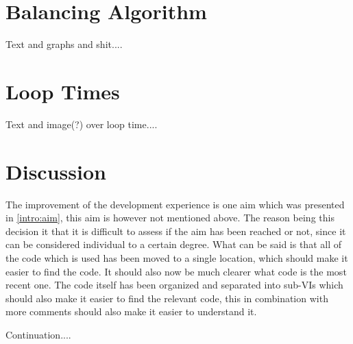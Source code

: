 \section{Balancing Algorithm} \label{results:balancing}

Text and graphs and shit....

\section{Loop Times}

Text and image(?) over loop time....

\section{Discussion}

The improvement of the development experience is one aim which was presented in \ref{intro:aim}, this aim is however not mentioned above. The reason being this decision it that it is difficult to assess if the aim has been reached or not, since it can be considered individual to a certain degree. What can be said is that all of the code which is used has been moved to a single location, which should make it easier to find the code. It should also now be much clearer what code is the most recent one. The code itself has been organized and separated into sub-VIs which should also make it easier to find the relevant code, this in combination with more comments should also make it easier to understand it.

Continuation....